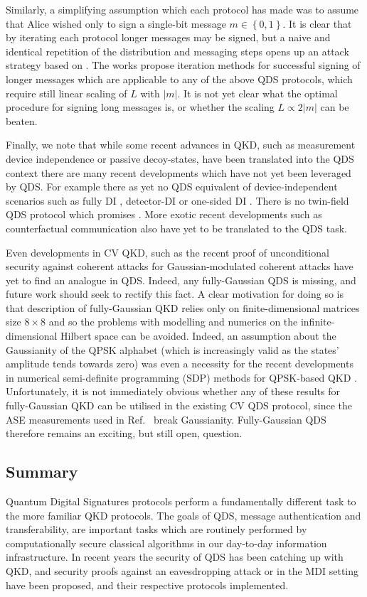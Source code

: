 Similarly, a simplifying assumption which each protocol has made was to assume that Alice wished only to sign a single-bit message $m \in \left\{0, 1\right\}$. It is clear that by iterating each protocol longer messages may be signed, but a naive and identical repetition of the distribution and messaging steps opens up an attack strategy based on . The works \cite{Wang2015, Wang2017} propose iteration methods for successful signing of longer messages which are applicable to any of the above QDS protocols, which require still linear scaling of $L$ with $\left|m\right|$. It is not yet clear what the optimal procedure for signing long messages is, or whether the scaling $L \propto 2 \left|m\right|$ can be beaten.

Finally, we note that while some recent advances in QKD, such as measurement device independence or passive decoy-states, have been translated into the QDS context there are many recent developments which have not yet been leveraged by QDS. For example there as yet no QDS equivalent of device-independent scenarios such as fully DI , detector-DI  or one-sided DI . There is no twin-field  QDS protocol which promises . More exotic recent developments such as counterfactual communication  also have yet to be translated to the QDS task. 

Even developments in CV QKD, such as the recent proof of unconditional security against coherent attacks for Gaussian-modulated coherent attacks have yet to find an analogue in QDS. Indeed, any fully-Gaussian QDS is missing, and future work should seek to rectify this fact. A clear motivation for doing so is that description of fully-Gaussian QKD relies only on finite-dimensional matrices size $8 \times 8$ \cite{Laudenbach2017} and so the problems with modelling and numerics on the infinite-dimensional Hilbert space can be avoided. Indeed, an assumption about the Gaussianity of the QPSK alphabet (which is increasingly valid as the states' amplitude tends towards zero) was even a necessity for the recent developments in numerical semi-definite programming (SDP) methods for QPSK-based QKD . Unfortunately, it is not immediately obvious whether any of these results for fully-Gaussian QKD can be utilised in the existing CV QDS protocol, since the ASE measurements used in Ref.~\cite{Croal2016} break Gaussianity. Fully-Gaussian QDS therefore remains an exciting, but still open, question.


\subsection{Summary}
Quantum Digital Signatures protocols perform a fundamentally different task to the more familiar QKD protocols. The goals of QDS, message authentication and transferability, are important tasks which are routinely performed by computationally secure classical algorithms in our day-to-day information infrastructure. In recent years the security of QDS has been catching up with QKD, and security proofs against an eavesdropping attack \cite{Amiri2016, Yin2106} or in the MDI setting \cite{Puthoor2016} have been proposed, and their respective protocols implemented. 

